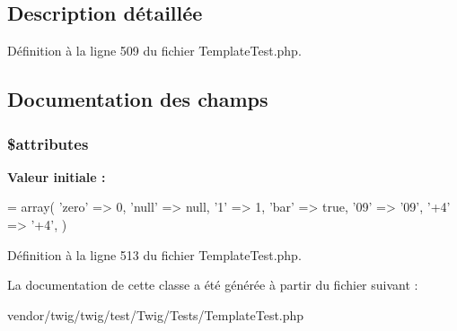 \subsection{Description détaillée}


Définition à la ligne 509 du fichier Template\+Test.\+php.



\subsection{Documentation des champs}
\subsubsection[{\texorpdfstring{\$attributes}{$attributes}}]{\setlength{\rightskip}{0pt plus 5cm}\$attributes}\hypertarget{class_twig___template_magic_property_object_adc851f7a62250e75df0490c0280aef4c}{}\label{class_twig___template_magic_property_object_adc851f7a62250e75df0490c0280aef4c}
{\bfseries Valeur initiale \+:}
\begin{DoxyCode}
= array(
        \textcolor{stringliteral}{'zero'} => 0,
        \textcolor{stringliteral}{'null'} => null,
        \textcolor{charliteral}{'1'} => 1,
        \textcolor{stringliteral}{'bar'} => \textcolor{keyword}{true},
        \textcolor{stringliteral}{'09'} => \textcolor{stringliteral}{'09'},
        \textcolor{stringliteral}{'+4'} => \textcolor{stringliteral}{'+4'},
    )
\end{DoxyCode}


Définition à la ligne 513 du fichier Template\+Test.\+php.



La documentation de cette classe a été générée à partir du fichier suivant \+:\begin{DoxyCompactItemize}
\item 
vendor/twig/twig/test/\+Twig/\+Tests/Template\+Test.\+php\end{DoxyCompactItemize}
